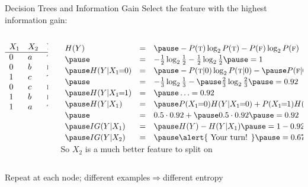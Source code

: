 \documentclass[14pt]{beamer}
\begin{document}
\begin{frame}{Decision Trees and Information Gain}
Select the feature with the highest information gain:\\
\medskip
\begin{columns}[T]
\begin{column}{0.14\textwidth}
\setlength{\arraycolsep}{0.1em}
\small
$
\begin{array}{ l l l }
X_1 & X_2 & Y \\
\hline
0   & a   & \textsc{t} \\
0   & b   & \textsc{f} \\
1   & c   & \textsc{t} \\
0   & c   & \textsc{f} \\
1   & b   & \textsc{f} \\
1   & a   & \textsc{t} \\
\end{array}
$
\end{column}
\pause
\begin{column}{0.83\textwidth}
\setlength{\arraycolsep}{0.1em}
\small
$
\extrarowheight=2pt
\begin{array}{ l l l l }
H(Y)
& = & \pause -P(\textsc{t})\log_2 P(\textsc{t}) - P(\textsc{f})\log_2 P(\textsc{f}) \\
\pause
& = & -\frac{1}{2}\log_2 \frac{1}{2} - \frac{1}{2}\log_2 \frac{1}{2} \pause = 1 \\
\pause
H(Y|X_1\!\!=\!\!0)
& = & \pause -P(\textsc{t}|0)\log_2 P(\textsc{t}|0) - \pause P(\textsc{f}|0)\log_2 P(\textsc{f}|0) \\
\pause
& = & - \frac{1}{3}\log_2 \frac{1}{3} - \pause \frac{2}{3}\log_2 \frac{2}{3} \pause = 0.92\\
\pause         
H(Y|X_1\!\!=\!\!1)
& = & \pause \ldots = 0.92\\
\pause         
H(Y|X_1)
& = & \pause P(X_1\!\!=\!\!0) H(Y|X_1\!\!=\!\!0) + P(X_1\!\!=\!\!1) H(Y|X_1\!\!=\!\!1) \\
\pause         
& = & 0.5 \cdot 0.92 + \pause 0.5 \cdot 0.92 \pause = 0.92 \\
\pause
IG(Y|X_1)
& = & \pause H(Y) - H(Y|X_1) \pause = 1 - 0.92 \pause = 0.08 \\
\pause         
IG(Y|X_2)
& = & \pause \mbox{\alert{ Your turn! }} \pause = 0.67 \\
\end{array}
$ \\
\medskip
\pause
So $X_2$ is a much better feature to split on
\end{column}
\end{columns}
\pause
\bigskip
Repeat at each node\pause; different examples$\Rightarrow$different entropy
\end{frame}
\end{document}
